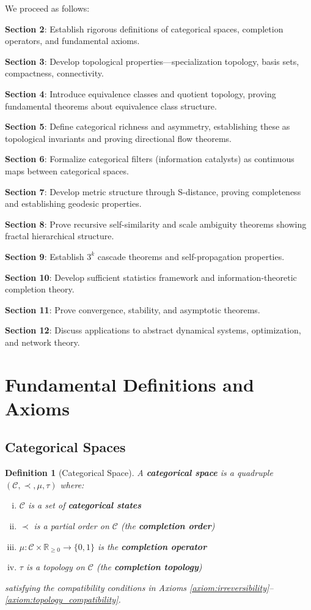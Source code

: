 \documentclass[12pt,a4paper]{article}
\newtheorem{definition}[theorem]{Definition}
\begin{document}
We proceed as follows:

\textbf{Section 2}: Establish rigorous definitions of categorical spaces, completion operators, and fundamental axioms.

\textbf{Section 3}: Develop topological properties—specialization topology, basis sets, compactness, connectivity.

\textbf{Section 4}: Introduce equivalence classes and quotient topology, proving fundamental theorems about equivalence class structure.

\textbf{Section 5}: Define categorical richness and asymmetry, establishing these as topological invariants and proving directional flow theorems.

\textbf{Section 6}: Formalize categorical filters (information catalysts) as continuous maps between categorical spaces.

\textbf{Section 7}: Develop metric structure through S-distance, proving completeness and establishing geodesic properties.

\textbf{Section 8}: Prove recursive self-similarity and scale ambiguity theorems showing fractal hierarchical structure.

\textbf{Section 9}: Establish $3^k$ cascade theorems and self-propagation properties.

\textbf{Section 10}: Develop sufficient statistics framework and information-theoretic completion theory.

\textbf{Section 11}: Prove convergence, stability, and asymptotic theorems.

\textbf{Section 12}: Discuss applications to abstract dynamical systems, optimization, and network theory.

\section{Fundamental Definitions and Axioms}

\subsection{Categorical Spaces}

\begin{definition}[Categorical Space]
\label{def:categorical_space}
A \textbf{categorical space} is a quadruple $(\mathcal{C}, \prec, \mu, \tau)$ where:
\begin{enumerate}[(i)]
\item $\mathcal{C}$ is a set of \textbf{categorical states}
\item $\prec$ is a partial order on $\mathcal{C}$ (the \textbf{completion order})
\item $\mu: \mathcal{C} \times \mathbb{R}_{\geq 0} \to \{0, 1\}$ is the \textbf{completion operator}
\item $\tau$ is a topology on $\mathcal{C}$ (the \textbf{completion topology})
\end{enumerate}
satisfying the compatibility conditions in Axioms \ref{axiom:irreversibility}--\ref{axiom:topology_compatibility}.
\end{definition}
\end{document}
